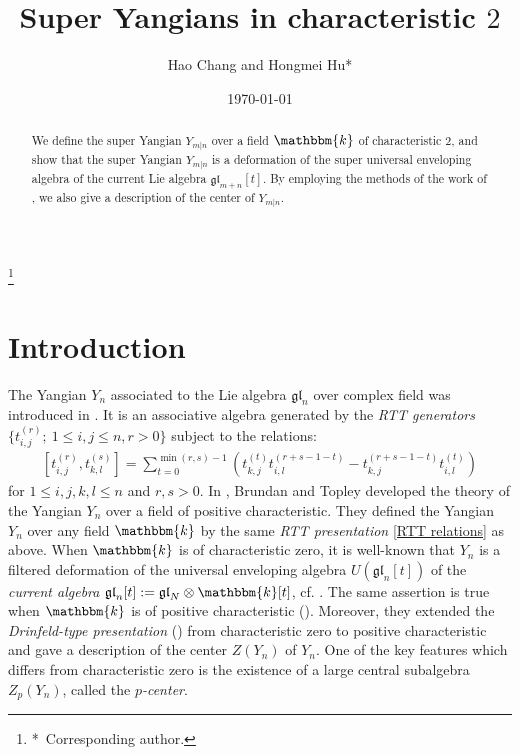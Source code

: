 \documentclass[12pt,reqno]{amsart}
\newcommand{\fgl}{\mathfrak{gl}}
\newcommand{\kk}{\mathbbm{k}}
\numberwithin{equation}{section}
\theoremstyle{Theorem}
\theoremstyle{remark}
\numberwithin{equation}{section}
\begin{document}
\title[even char]{Super Yangians in characteristic $2$}
\author[Hao Chang \lowercase{and} Hongmei Hu]{Hao Chang \lowercase{and} Hongmei Hu*}
\address[Hao Chang]{School of Mathematics and Statistics, Central China Normal University, Wuhan 430079, China}
\address[Hongmei Hu]{Department of Mathematics, Shanghai Maritime University, Shanghai 201306, China}
\date{\today}
\thanks{*~Corresponding author.}

\begin{abstract}
We define the super Yangian $Y_{m|n}$ over a field $\kk$ of characteristic $2$,
and show that the super Yangian $Y_{m|n}$ is a 
deformation of the super universal enveloping algebra of the current Lie algebra $\fgl_{m+n}[t]$.
By employing the methods of the work of \cite{BT18}, 
we also give a description of the center of $Y_{m|n}$.
\end{abstract}
\maketitle
\section{Introduction}
The Yangian $Y_n$ associated to the Lie
algebra $\fgl_n$ over complex field was introduced in \cite{TF79}.
It is an associative algebra generated by the {\it RTT generators} 
$\{t_{i,j}^{(r)};~1\leq i,j\leq n,r>0\}$ subject to the relations:
\begin{align}\label{RTT relations}
\left[t_{i,j}^{(r)}, t_{k,l}^{(s)}\right] =\sum_{t=0}^{\min(r,s)-1}
\left(t_{k, j}^{(t)} t_{i,l}^{(r+s-1-t)}-
t_{k,j}^{(r+s-1-t)}t_{i,l}^{(t)}\right)
\end{align}
for $1\leq i,j,k,l\leq n$ and $r,s>0$.
In \cite{BT18},
Brundan and Topley developed the theory of the Yangian $Y_n$ over a field of positive
characteristic.
They defined the Yangian $Y_n$ over any field $\kk$ by the same {\it RTT presentation} \eqref{RTT relations} as above.
When $\kk$ is of characteristic zero,
it is well-known that $Y_n$ is a filtered deformation of the universal enveloping algebra 
$U(\fgl_n[t])$ of the {\it current algebra} $\fgl_n[t]:=\fgl_N\otimes \kk[t]$, cf. \cite{MNO96}.
The same assertion is true when $\kk$ is of positive characteristic (\cite[Lemma 4.2]{BT18}).
Moreover,
they extended the {\it Drinfeld-type presentation} (\cite{D88, BK05}) from characteristic zero to positive characteristic and gave a description of the center $Z(Y_n)$ of $Y_n$.
One of the key features which differs from characteristic zero is the existence of a large central subalgebra $Z_p(Y_n)$,
called the {\it $p$-center}.
\end{document}
